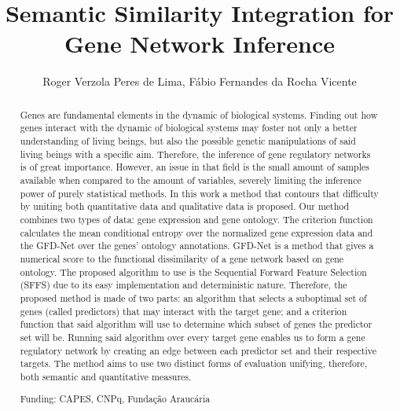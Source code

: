 \documentclass[twoside]{article}
\title{\vspace{-15mm}\fontsize{24pt}{10pt}\selectfont\textbf{ Semantic Similarity Integration for Gene Network Inference }} %
\author{ Roger Verzola Peres de Lima, F\'abio Fernandes da Rocha Vicente }
\affil{ Federal University of Technology - Paran\'a }
\date{}
\begin{document}
  
  
  \maketitle %
  
  
  \thispagestyle{fancy} %
  
  
  \begin{abstract}
  Genes are fundamental elements in the dynamic of biological systems. Finding out how genes interact with the dynamic of biological systems may foster not only a better understanding of living beings,  but also the possible genetic manipulations of said living beings with a specific aim. Therefore,  the inference of gene regulatory networks is of great importance. However,  an issue in that field is the small amount of samples available when compared to the amount of variables,  severely limiting the inference power of purely statistical methods. In this work a method that contours that difficulty by uniting both quantitative data and qualitative data is proposed.
Our method combines two types of data: gene expression and gene ontology. The criterion function calculates the mean conditional entropy over the normalized gene expression data and the GFD-Net over the genes’ ontology annotations. GFD-Net is a method that gives a numerical score to the functional dissimilarity of a gene network based on gene ontology. The proposed algorithm to use is the Sequential Forward Feature Selection (SFFS) due to its easy implementation and deterministic nature.
Therefore,  the proposed method is made of two parts: an algorithm that selects a suboptimal set of genes (called predictors) that may interact with the target gene; and a criterion function that said algorithm will use to determine which subset of genes the predictor set will be. Running said algorithm over every target gene enables us to form a gene regulatory network by creating an edge between each predictor set and their respective targets.
The method aims to use two distinct forms of evaluation unifying,  therefore,  both semantic and quantitative measures.
  
  Funding: CAPES,  CNPq,  Funda\c{c}\~ao Arauc\'aria \\ 
  \end{abstract}
  
\end{document}
